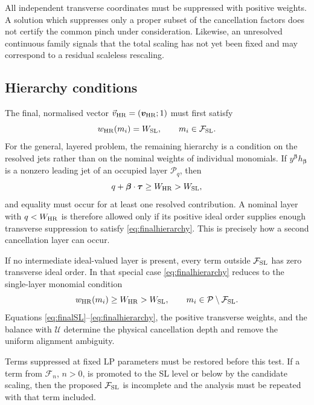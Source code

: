 \documentclass[a4paper,11pt]{article}
\newcommand{\HR}{\mathrm{HR}}
\newcommand{\FSL}{\mathcal F_{\rm SL}}
\newcommand{\WSL}{W_{\rm SL}}
\newcommand{\WHR}{W_{\rm HR}}
\newcommand{\vHR}{\vec v_{\rm HR}}
\begin{document}
All independent transverse coordinates must be suppressed with positive
weights.  A solution which suppresses only a proper subset of the
cancellation factors does not certify the common pinch under consideration.
Likewise, an unresolved continuous family signals that the total scaling has
not yet been fixed and may correspond to a residual scaleless rescaling.

\subsection{Hierarchy conditions}

The final, normalised vector \(\vHR=(\boldsymbol v_{\HR};1)\) must first
satisfy
\begin{equation}
 w_{\HR}(m_i)=\WSL,
 \qquad m_i\in\FSL.
\label{eq:finalSL}
\end{equation}
For the general, layered problem, the remaining hierarchy is a condition on
the resolved jets rather than on the nominal weights of individual
monomials.  If \(y^{\boldsymbol\beta}h_{\boldsymbol\beta}\) is a nonzero
leading jet of an occupied layer \(\mathcal P_q\), then
\begin{equation}
 q+\boldsymbol\beta\cdot\boldsymbol\tau
 \geq\WHR>\WSL,
\label{eq:finalhierarchy}
\end{equation}
and equality must occur for at least one resolved contribution.  A nominal
layer with \(q<\WHR\) is therefore allowed only if its positive ideal order
supplies enough transverse suppression to satisfy
\eqref{eq:finalhierarchy}.  This is precisely how a second cancellation
layer can occur.

If no intermediate ideal-valued layer is present, every term outside
\(\FSL\) has zero transverse ideal order.  In that special case
\eqref{eq:finalhierarchy} reduces to the single-layer monomial condition
\begin{equation}
 w_{\HR}(m_i)\geq\WHR>\WSL,
 \qquad m_i\in\mathcal P\setminus\FSL.
\label{eq:single-layer-hierarchy}
\end{equation}
Equations \eqref{eq:finalSL}--\eqref{eq:finalhierarchy}, the positive
transverse weights, and the balance with \(\mathcal U\) determine the
physical cancellation depth and remove the uniform alignment ambiguity.

Terms suppressed at fixed LP parameters must be restored before this
test.  If a term from \(\mathcal F_n\), \(n>0\), is promoted to the SL level
or below by the candidate scaling, then the proposed \(\FSL\) is incomplete
and the analysis must be repeated with that term included.
\end{document}
